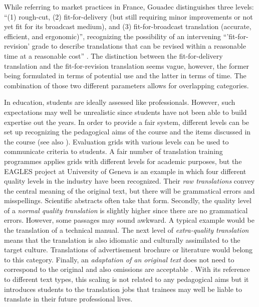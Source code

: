 \documentclass[output=paper]{langsci/langscibook}
\begin{document}
While referring to market practices in France, Gouadec distinguishes three levels: ``(1) rough-cut, (2) fit-for-delivery (but still requiring minor improvements or not yet fit for its broadcast medium), and (3) fit-for-broadcast translation (accurate, efficient, and ergonomic)'', recognizing the possibility of an intervening ``'fit-for-revision’ grade to describe translations that can be revised within a reasonable time at a reasonable cost'' \citep{Gouadec2010}. The distinction between the fit-for-delivery translation and the fit-for-revision translation seems vague, however, the former being formulated in terms of potential use and the latter in terms of time. The combination of those two different parameters allows for overlapping categories.


In education, students are ideally assessed like professionals. However, such expectations may well be unrealistic since students have not been able to build expertise out the years. In order to provide a fair system, different levels can be set up recognizing the pedagogical aims of the course and the items discussed in the course (see also \citealt{Vandepitteforthcoming}). Evaluation grids with various levels can be used to communicate criteria to students. A fair number of translation training programmes applies grids with different levels for academic purposes, but the EAGLES project at University of Geneva is an example in which four different quality levels in the industry have been recognized. Their \textit{raw translations} convey the central meaning of the original text, but there will be grammatical errors and misspellings. Scientific abstracts often take that form. Secondly, the quality level of a \textit{normal quality translation} is slightly higher since there are no grammatical errors. However, some passages may sound awkward. A typical example would be the translation of a technical manual. The next level of \textit{extra-quality translation} means that the translation is also idiomatic and culturally assimilated to the target culture. Translations of advertisement brochure or literature would belong to this category. Finally, an \textit{adaptation of an original text} does not need to correspond to the original and also omissions are acceptable \citep{KingEtAl1995}. With its reference to different text types, this scaling is not related to any pedagogical aims but it introduces students to the translation jobs that trainees may well be liable to translate in their future professional lives.
\end{document}
